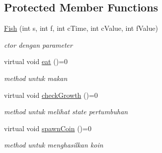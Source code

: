 \subsection*{Protected Member Functions}
\begin{DoxyCompactItemize}
\item 
\mbox{\label{classFish_a123e4318157433128d2b6a31a3e752d2}} 
\hyperlink{classFish_a123e4318157433128d2b6a31a3e752d2}{Fish} (int s, int f, int c\+Time, int c\+Value, int f\+Value)
\begin{DoxyCompactList}\small\item\em ctor dengan parameter \end{DoxyCompactList}\item 
\mbox{\label{classFish_af209980bd39b8de9b4bb38b7ad4edd04}} 
virtual void \hyperlink{classFish_af209980bd39b8de9b4bb38b7ad4edd04}{eat} ()=0
\begin{DoxyCompactList}\small\item\em method untuk makan \end{DoxyCompactList}\item 
\mbox{\label{classFish_a45d7032d8c2eacedabb8a28799399adb}} 
virtual void \hyperlink{classFish_a45d7032d8c2eacedabb8a28799399adb}{check\+Growth} ()=0
\begin{DoxyCompactList}\small\item\em method untuk melihat state pertumbuhan \end{DoxyCompactList}\item 
\mbox{\label{classFish_acd7cbe8b09a544ca22e92a8edde1bacd}} 
virtual void \hyperlink{classFish_acd7cbe8b09a544ca22e92a8edde1bacd}{spawn\+Coin} ()=0
\begin{DoxyCompactList}\small\item\em method untuk menghasilkan koin \end{DoxyCompactList}\end{DoxyCompactItemize}
